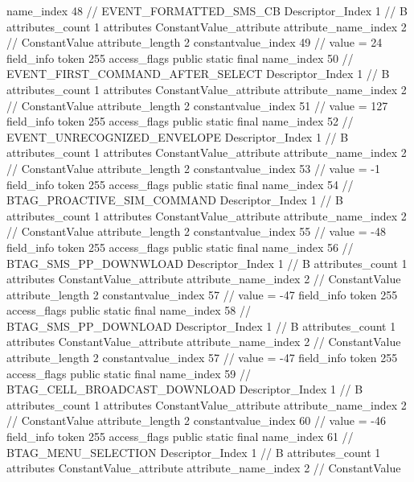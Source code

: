 {{{{{				name_index	48		// EVENT_FORMATTED_SMS_CB
				Descriptor_Index	1		// B
				attributes_count	1
				attributes {
				ConstantValue_attribute {
					attribute_name_index	2		// ConstantValue
					attribute_length	2
					constantvalue_index	49		// value = 24
				}
				}
			}
			field_info {
				token	255
				access_flags	public static final
				name_index	50		// EVENT_FIRST_COMMAND_AFTER_SELECT
				Descriptor_Index	1		// B
				attributes_count	1
				attributes {
				ConstantValue_attribute {
					attribute_name_index	2		// ConstantValue
					attribute_length	2
					constantvalue_index	51		// value = 127
				}
				}
			}
			field_info {
				token	255
				access_flags	public static final
				name_index	52		// EVENT_UNRECOGNIZED_ENVELOPE
				Descriptor_Index	1		// B
				attributes_count	1
				attributes {
				ConstantValue_attribute {
					attribute_name_index	2		// ConstantValue
					attribute_length	2
					constantvalue_index	53		// value = -1
				}
				}
			}
			field_info {
				token	255
				access_flags	public static final
				name_index	54		// BTAG_PROACTIVE_SIM_COMMAND
				Descriptor_Index	1		// B
				attributes_count	1
				attributes {
				ConstantValue_attribute {
					attribute_name_index	2		// ConstantValue
					attribute_length	2
					constantvalue_index	55		// value = -48
				}
				}
			}
			field_info {
				token	255
				access_flags	public static final
				name_index	56		// BTAG_SMS_PP_DOWNWLOAD
				Descriptor_Index	1		// B
				attributes_count	1
				attributes {
				ConstantValue_attribute {
					attribute_name_index	2		// ConstantValue
					attribute_length	2
					constantvalue_index	57		// value = -47
				}
				}
			}
			field_info {
				token	255
				access_flags	public static final
				name_index	58		// BTAG_SMS_PP_DOWNLOAD
				Descriptor_Index	1		// B
				attributes_count	1
				attributes {
				ConstantValue_attribute {
					attribute_name_index	2		// ConstantValue
					attribute_length	2
					constantvalue_index	57		// value = -47
				}
				}
			}
			field_info {
				token	255
				access_flags	public static final
				name_index	59		// BTAG_CELL_BROADCAST_DOWNLOAD
				Descriptor_Index	1		// B
				attributes_count	1
				attributes {
				ConstantValue_attribute {
					attribute_name_index	2		// ConstantValue
					attribute_length	2
					constantvalue_index	60		// value = -46
				}
				}
			}
			field_info {
				token	255
				access_flags	public static final
				name_index	61		// BTAG_MENU_SELECTION
				Descriptor_Index	1		// B
				attributes_count	1
				attributes {
				ConstantValue_attribute {
					attribute_name_index	2		// ConstantValue
}}}}}}}
